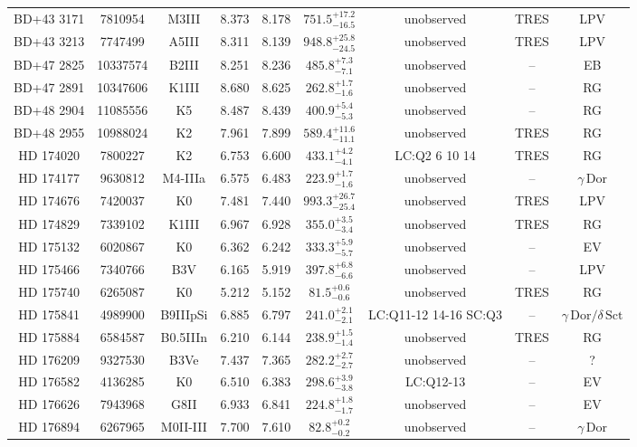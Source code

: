 \begin{table*}
\begin{tabular}{ccccccccc}
BD+43 3171 & 7810954 & M3III & 8.373 & 8.178 & $751.5^{+17.2}_{-16.5}$ & unobserved & TRES & LPV \\
BD+43 3213 & 7747499 & A5III & 8.311 & 8.139 & $948.8^{+25.8}_{-24.5}$ & unobserved & TRES & LPV \\
BD+47 2825 & 10337574 & B2III & 8.251 & 8.236 & $485.8^{+7.3}_{-7.1}$ & unobserved & -- & EB \\
BD+47 2891 & 10347606 & K1III & 8.680 & 8.625 & $262.8^{+1.7}_{-1.6}$ & unobserved & -- & RG \\
BD+48 2904 & 11085556 & K5 & 8.487 & 8.439 & $400.9^{+5.4}_{-5.3}$ & unobserved & -- & RG \\
BD+48 2955 & 10988024 & K2 & 7.961 & 7.899 & $589.4^{+11.6}_{-11.1}$ & unobserved & TRES & RG \\
HD 174020 & 7800227 & K2 & 6.753 & 6.600 & $433.1^{+4.2}_{-4.1}$ & LC:Q2 6 10 14 & TRES & RG \\
HD 174177 & 9630812 & M4-IIIa & 6.575 & 6.483 & $223.9^{+1.7}_{-1.6}$ & unobserved & -- & $\gamma\,\text{Dor}$ \\
HD 174676 & 7420037 & K0 & 7.481 & 7.440 & $993.3^{+26.7}_{-25.4}$ & unobserved & TRES & LPV \\
HD 174829 & 7339102 & K1III & 6.967 & 6.928 & $355.0^{+3.5}_{-3.4}$ & unobserved & TRES & RG \\
HD 175132 & 6020867 & K0 & 6.362 & 6.242 & $333.3^{+5.9}_{-5.7}$ & unobserved & -- & EV \\
HD 175466 & 7340766 & B3V & 6.165 & 5.919 & $397.8^{+6.8}_{-6.6}$ & unobserved & -- & LPV \\
HD 175740 & 6265087 & K0 & 5.212 & 5.152 & $81.5^{+0.6}_{-0.6}$ & unobserved & TRES & RG \\
HD 175841 & 4989900 & B9IIIpSi & 6.885 & 6.797 & $241.0^{+2.1}_{-2.1}$ & LC:Q11-12 14-16 SC:Q3 & -- & $\gamma\,\text{Dor} /\delta\,\text{Sct}$ \\
HD 175884 & 6584587 & B0.5IIIn & 6.210 & 6.144 & $238.9^{+1.5}_{-1.4}$ & unobserved & TRES & RG \\
HD 176209 & 9327530 & B3Ve & 7.437 & 7.365 & $282.2^{+2.7}_{-2.7}$ & unobserved & -- & ? \\
HD 176582 & 4136285 & K0 & 6.510 & 6.383 & $298.6^{+3.9}_{-3.8}$ & LC:Q12-13 & -- & EV \\
HD 176626 & 7943968 & G8II & 6.933 & 6.841 & $224.8^{+1.8}_{-1.7}$ & unobserved & -- & EV \\
HD 176894 & 6267965 & M0II-III & 7.700 & 7.610 & $82.8^{+0.2}_{-0.2}$ & unobserved & -- & $\gamma\,\text{Dor}$ \\

\end{tabular}
\end{table*}
